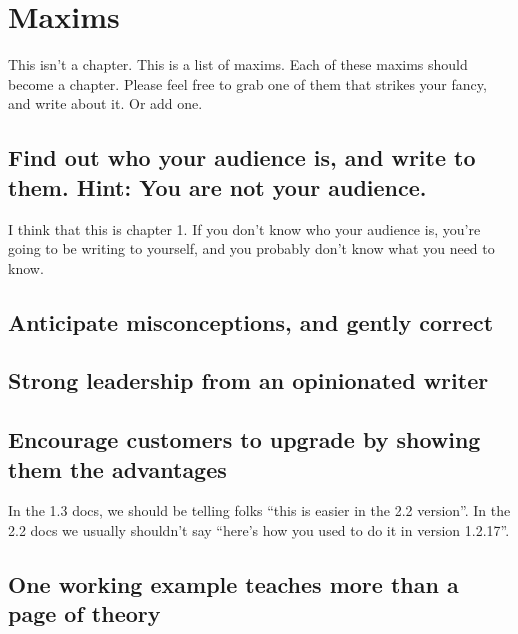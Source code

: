 \chapter{Maxims}

This isn't a chapter. This is a list of maxims. Each of these maxims
should become a chapter. Please feel free to grab one of them that
strikes your fancy, and write about it. Or add one.

\section{Find out who your audience is, and write to them. Hint: You are
not your audience.}

I think that this is chapter 1. If you don't know who your audience is,
you're going to be writing to yourself, and you probably don't know what
you need to know.

\section{Anticipate misconceptions, and gently correct}

\section{Strong leadership from an opinionated writer}

\section{Encourage customers to upgrade by showing them the advantages}

In the 1.3 docs, we should be telling folks ``this is easier in the 2.2
version''. In the 2.2 docs we usually shouldn't say ``here's how you
used to do it in version 1.2.17''.

\section{One working example teaches more than a page of theory}


